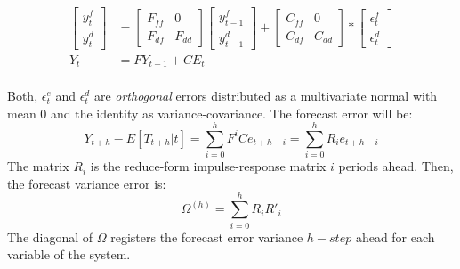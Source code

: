 \documentclass[12pt, a4paper]{article}
\begin{document}
	\begin{equation}
	   \begin{aligned}
	     \left[ \begin{array}{c}  y^{f}_t  \\ y^{d}_t \end{array} \right]
	    & =
		\left[ \begin{array}{cc}  F_{ff} & 0 \\ F_{df} & F_{dd}\end{array} \right]
		\left[ \begin{array}{c}  y^{f}_{t-1}  \\ y^{d}_{t-1}  \end{array} \right]
	 	+
    	\left[ \begin{array}{cc}  C_{ff} & 0 \\ C_{df} & C_{dd}\end{array} \right]  *\left[ \begin{array}{c}  \epsilon^f_{t}  \\ \epsilon^d_{t}  \end{array} \right]  \\
	   Y_t & = F Y_{t-1} + C E_t
	\end{aligned}
	\end{equation} \\
Both, $\epsilon^e_{t}$ and $\epsilon^d_{t}$ are \textit{orthogonal} errors distributed as a multivariate normal with mean 0 and the identity as variance-covariance. The forecast error will be:
\begin{equation*}
	Y_{t+h}  - E[T_{t+h}|t] = \sum_{i=0}^h F^{i} C e_{t+h-i} = \sum_{i=0}^h R_{i} e_{t+h-i}
\end{equation*}
The matrix $R_i$ is the reduce-form impulse-response matrix $i$ periods ahead. Then, the forecast variance error is:
\begin{equation}
	 \Omega^{(h)} = \sum_{i=0}^h R_{i} R'_{i}
\end{equation}
The diagonal of $\Omega$ registers the forecast error variance $h-step$ ahead for each variable of the system.
\end{document}
